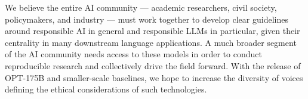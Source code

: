 We believe the entire AI community — academic researchers, civil society, policymakers, and industry — must work together to develop clear guidelines around responsible AI in general and responsible LLMs in particular, given their centrality in many downstream language applications. A much broader segment of the AI community needs access to these models in order to conduct reproducible research and collectively drive the field forward. With the release of OPT-175B and smaller-scale baselines, we hope to increase the diversity of voices defining the ethical considerations of such technologies.

